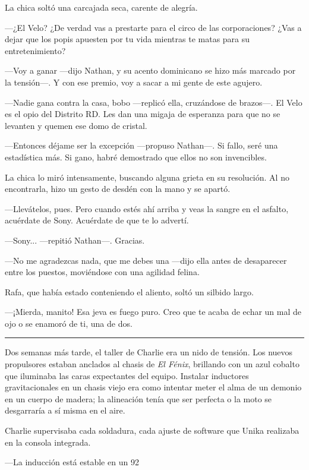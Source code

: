 \documentclass[12pt,a4paper]{book}
\begin{document}
La chica soltó una carcajada seca, carente de alegría.

---¿El Velo? ¿De verdad vas a prestarte para el circo de las corporaciones? ¿Vas a dejar que los popis apuesten por tu vida mientras te matas para su entretenimiento?

---Voy a ganar ---dijo Nathan, y su acento dominicano se hizo más marcado por la tensión---. Y con ese premio, voy a sacar a mi gente de este agujero.

---Nadie gana contra la casa, bobo ---replicó ella, cruzándose de brazos---. El Velo es el opio del Distrito RD. Les dan una migaja de esperanza para que no se levanten y quemen ese domo de cristal.

---Entonces déjame ser la excepción ---propuso Nathan---. Si fallo, seré una estadística más. Si gano, habré demostrado que ellos no son invencibles.

La chica lo miró intensamente, buscando alguna grieta en su resolución. Al no encontrarla, hizo un gesto de desdén con la mano y se apartó.

---Llevátelos, pues. Pero cuando estés ahí arriba y veas la sangre en el asfalto, acuérdate de Sony. Acuérdate de que te lo advertí.

---Sony... ---repitió Nathan---. Gracias.

---No me agradezcas nada, que me debes una ---dijo ella antes de desaparecer entre los puestos, moviéndose con una agilidad felina.

Rafa, que había estado conteniendo el aliento, soltó un silbido largo.

---¡Mierda, manito! Esa jeva es fuego puro. Creo que te acaba de echar un mal de ojo o se enamoró de ti, una de dos.

\bigskip
\noindent\rule{\textwidth}{0.4pt}
\bigskip

Dos semanas más tarde, el taller de Charlie era un nido de tensión. Los nuevos propulsores estaban anclados al chasis de \textit{El Fénix}, brillando con un azul cobalto que iluminaba las caras expectantes del equipo. Instalar inductores gravitacionales en un chasis viejo era como intentar meter el alma de un demonio en un cuerpo de madera; la alineación tenía que ser perfecta o la moto se desgarraría a sí misma en el aire.

Charlie supervisaba cada soldadura, cada ajuste de software que Unika realizaba en la consola integrada.

---La inducción está estable en un 92%
\end{document}
